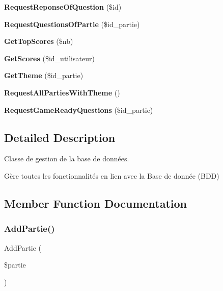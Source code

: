 \begin{DoxyCompactItemize}
{\bfseries Request\+Reponse\+Of\+Question} (\$id)
\item 
\mbox{\label{class_interface_b_d_d_aed61db0c78fb2022c40b11e4c7623096}} 
{\bfseries Request\+Questions\+Of\+Partie} (\$id\+\_\+partie)
\item 
\mbox{\label{class_interface_b_d_d_a3c8410b12dc8ab5319af2f9b95248658}} 
{\bfseries Get\+Top\+Scores} (\$nb)
\item 
\mbox{\label{class_interface_b_d_d_a0bed09747595044e2aef3e3ce363c126}} 
{\bfseries Get\+Scores} (\$id\+\_\+utilisateur)
\item 
\mbox{\label{class_interface_b_d_d_aa0363b9684feb940bb3ad88fc322bdc8}} 
{\bfseries Get\+Theme} (\$id\+\_\+partie)
\item 
\mbox{\label{class_interface_b_d_d_a9d671df2428c378fcb683f587e2a62d5}} 
{\bfseries Request\+All\+Parties\+With\+Theme} ()
\item 
\mbox{\label{class_interface_b_d_d_ab3cac1dc81aaa3b978c19e40f585139d}} 
{\bfseries Request\+Game\+Ready\+Questions} (\$id\+\_\+partie)
\end{DoxyCompactItemize}


\subsection{Detailed Description}
Classe de gestion de la base de données. 

Gère toutes les fonctionnalités en lien avec la Base de donnée (B\+DD) 

\subsection{Member Function Documentation}
\mbox{\label{class_interface_b_d_d_a0bbed9af515a32afda28ca2f057d02fc}} 
\subsubsection{\texorpdfstring{Add\+Partie()}{AddPartie()}}
{\footnotesize\ttfamily Add\+Partie (\begin{DoxyParamCaption}\item[{}]{\$partie }\end{DoxyParamCaption})}



